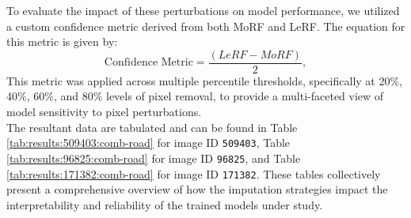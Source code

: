 To evaluate the impact of these perturbations on model performance, we utilized a custom confidence metric derived from both MoRF and LeRF. The equation for this metric is given by:
\begin{equation*}
    \text{Confidence Metric} = \frac{(LeRF - MoRF)}{2},
\end{equation*}
This metric was applied across multiple percentile thresholds, specifically at 20\%, 40\%, 60\%, and 80\% levels of pixel removal, to provide a multi-faceted view of model sensitivity to pixel perturbations.\\

The resultant data are tabulated and can be found in Table \ref{tab:results:509403:comb-road} for image ID \texttt{509403}, Table \ref{tab:results:96825:comb-road} for image ID \texttt{96825}, and Table \ref{tab:results:171382:comb-road} for image ID \texttt{171382}. These tables collectively present a comprehensive overview of how the imputation strategies impact the interpretability and reliability of the trained models under study.


